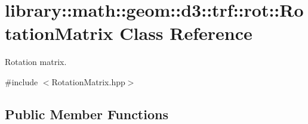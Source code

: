 \hypertarget{classlibrary_1_1math_1_1geom_1_1d3_1_1trf_1_1rot_1_1_rotation_matrix}{}\section{library\+:\+:math\+:\+:geom\+:\+:d3\+:\+:trf\+:\+:rot\+:\+:Rotation\+Matrix Class Reference}
\label{classlibrary_1_1math_1_1geom_1_1d3_1_1trf_1_1rot_1_1_rotation_matrix}


Rotation matrix.  




{\ttfamily \#include $<$Rotation\+Matrix.\+hpp$>$}

\subsection*{Public Member Functions}
